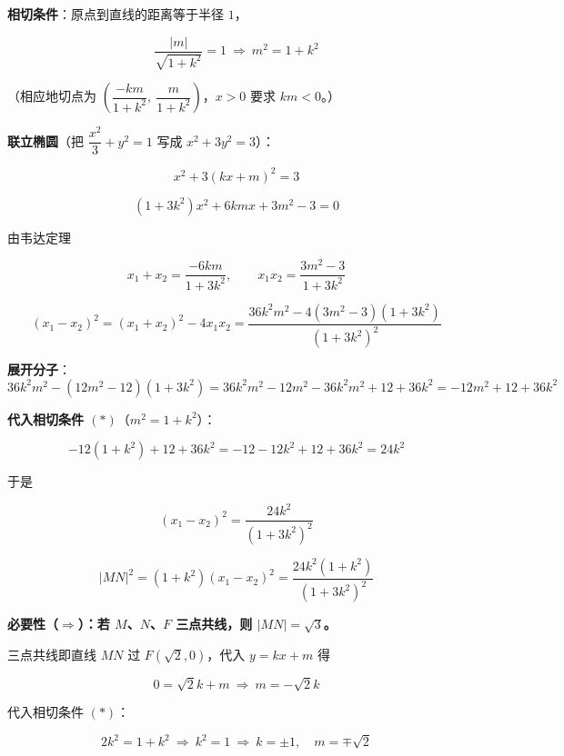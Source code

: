 \begin{answer}
\textbf{相切条件}：原点到直线的距离等于半径 $1$，

\nopagebreak[4]
\[\frac{|m|}{\sqrt{1+k^{2}}}=1\ \Longrightarrow\ m^{2}=1+k^{2}\tag{$\ast$}\]

（相应地切点为 $\left(\dfrac{-km}{1+k^{2}},\ \dfrac m{1+k^{2}}\right)$，$x>0$ 要求 $km<0$。）

\textbf{联立椭圆}（把 $\dfrac{x^{2}}3+y^{2}=1$ 写成 $x^{2}+3y^{2}=3$）：

\nopagebreak[4]
\[x^{2}+3(kx+m)^{2}=3\]

\nopagebreak[4]
\[\left(1+3k^{2}\right)x^{2}+6kmx+3m^{2}-3=0\]

由韦达定理

\nopagebreak[4]
\[x_1+x_2=\frac{-6km}{1+3k^{2}},\qquad x_1x_2=\frac{3m^{2}-3}{1+3k^{2}}\]

\nopagebreak[4]
\[\left(x_1-x_2\right)^{2}=\left(x_1+x_2\right)^{2}-4x_1x_2=\frac{36k^{2}m^{2}-4\left(3m^{2}-3\right)\left(1+3k^{2}\right)}{\left(1+3k^{2}\right)^{2}}\]

\textbf{展开分子}：
\nopagebreak[4]
\[36k^{2}m^{2}-\left(12m^{2}-12\right)\left(1+3k^{2}\right)=36k^{2}m^{2}-12m^{2}-36k^{2}m^{2}+12+36k^{2}=-12m^{2}+12+36k^{2}\]

\textbf{代入相切条件 $(\ast)$}（$m^{2}=1+k^{2}$）：

\nopagebreak[4]
\[-12\left(1+k^{2}\right)+12+36k^{2}=-12-12k^{2}+12+36k^{2}=24k^{2}\]

于是

\nopagebreak[4]
\[\left(x_1-x_2\right)^{2}=\frac{24k^{2}}{\left(1+3k^{2}\right)^{2}}\]

\nopagebreak[4]
\[|MN|^{2}=\left(1+k^{2}\right)\left(x_1-x_2\right)^{2}=\frac{24k^{2}\left(1+k^{2}\right)}{\left(1+3k^{2}\right)^{2}}\tag{$\ast\ast$}\]

\par\medskip

\textbf{必要性（$\Longrightarrow$）：若 $M$、$N$、$F$ 三点共线，则 $|MN|=\sqrt3$。}

三点共线即直线 $MN$ 过 $F\left(\sqrt2,0\right)$，代入 $y=kx+m$ 得

\nopagebreak[4]
\[0=\sqrt2k+m\ \Longrightarrow\ m=-\sqrt2k\]

代入相切条件 $(\ast)$：

\nopagebreak[4]
\[2k^{2}=1+k^{2}\ \Longrightarrow\ k^{2}=1\ \Longrightarrow\ k=\pm1,\quad m=\mp\sqrt2\]


\end{answer}
